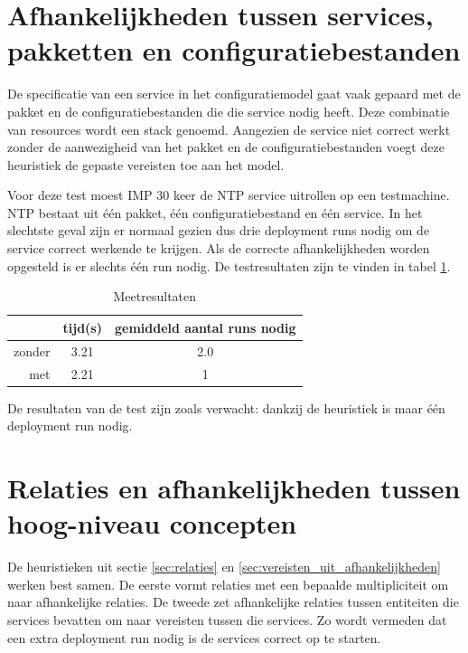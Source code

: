 \section{Afhankelijkheden tussen services, pakketten en configuratiebestanden}
\label{sec:stacks_eval}
De specificatie van een service in het configuratiemodel gaat vaak gepaard met de pakket en de configuratiebestanden die die service nodig heeft.
Deze combinatie van resources wordt een stack genoemd.
Aangezien de service niet correct werkt zonder de aanwezigheid van het pakket en de configuratiebestanden voegt deze heuristiek de gepaste vereisten toe aan het model.


Voor deze test moest IMP 30 keer de NTP service uitrollen op een testmachine.
NTP bestaat uit \'e\'en pakket, \'e\'en configuratiebestand en \'e\'en service. 
In het slechtste geval zijn er normaal gezien dus drie deployment runs nodig om de service correct werkende te krijgen.
Als de correcte afhankelijkheden worden opgesteld is er slechts \'e\'en run nodig.
De testresultaten zijn te vinden in tabel \ref{table:service_package_dep}.

\begin{table}
  \begin{center}
  \begin{tabular}{ r | c | c }
            & tijd(s)   & gemiddeld aantal runs nodig \\ \hline
    zonder  & 3.21      & 2.0 \\ \hline
    met     & 2.21      & 1 \\
  \end{tabular}
  \caption{Meetresultaten}
  \label{table:service_package_dep}
  \end{center}
\end{table}

De resultaten van de test zijn zoals verwacht: dankzij de heuristiek is maar \'e\'en deployment run nodig.

\section{Relaties en afhankelijkheden tussen hoog-niveau concepten}
De heuristieken uit sectie \ref{sec:relaties} en \ref{sec:vereisten_uit_afhankelijkheden} werken best samen.
De eerste vormt relaties met een bepaalde multipliciteit om naar afhankelijke relaties.
De tweede zet afhankelijke relaties tussen entiteiten die services bevatten om naar vereisten tussen die services.
Zo wordt vermeden dat een extra deployment run nodig is de services correct op te starten.

